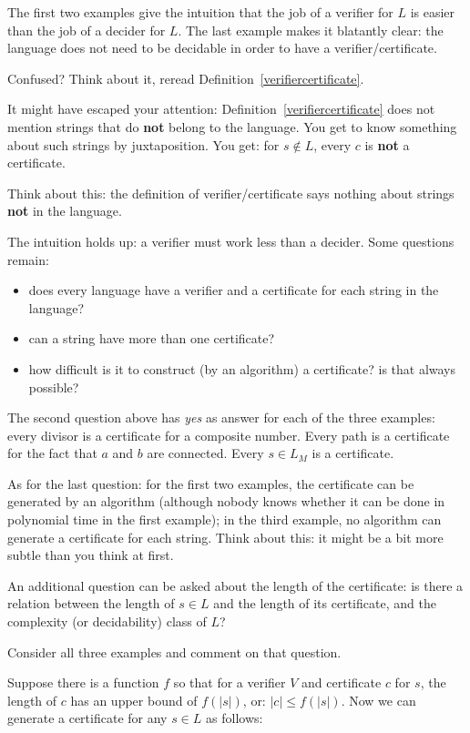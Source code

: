 The first two examples give the intuition that the job of a verifier
for $L$ is easier than the job of a decider for $L$. The last example
makes it blatantly clear: the language does not need to be decidable
in order to have a verifier/certificate.

Confused? Think about it, reread Definition~\ref{verifiercertificate}.

It might have escaped your attention:
Definition~\ref{verifiercertificate} does not mention strings that do
{\bf not} belong to the language. You get to know something about such
strings by juxtaposition. You get: for $s \notin L$, every $c$ is {\bf
not} a certificate.

Think about this: the definition of verifier/certificate says nothing
about strings {\bf not} in the language.

The intuition holds up: a verifier must work less than a decider. Some
questions remain:
\begin{itemize}
\item
does every language have a verifier and a certificate for each string
in the language?
\item
can a string have more than one certificate?
\item
how difficult is it to construct (by an algorithm) a certificate? is
that always possible?
\end{itemize}

The second question above has {\em yes} as answer for each of the
three examples: every divisor is a certificate for a composite number.
Every path is a certificate for the fact that $a$ and $b$ are
connected. Every $s \in L_M$ is a certificate.

As for the last question: for the first two examples, the certificate
can be generated by an algorithm (although nobody knows whether it can
be done in polynomial time in the first example); in the third
example, no algorithm can generate a certificate for each
string. Think about this: it might be a bit more subtle than you think
at first.

\begin{exercise}
An additional question can be asked about the length of the certificate: is there a relation between the length of $s \in L$ and the length of its certificate, and the complexity (or decidability) class of $L$?

Consider all three examples and comment on that question.
\end{exercise}
Suppose there is a function $f$ so that for a verifier $V$ and
certificate $c$ for $s$, the length of $c$ has an upper bound of
$f(|s|)$, or:
%
$|c| \leq f(|s|)$. Now we can generate a certificate for
any $s \in L$ as follows:

